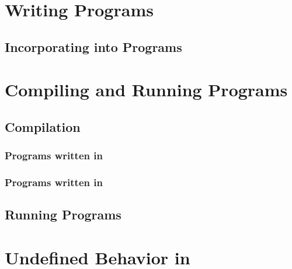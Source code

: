 \clearpage

\appendix

\pagestyle{fancy} \withlinenumbers
\fancyhf{}
\fancyhead[RE, LO]{\leftmark}
\fancyhead[RO, LE]{\thepage}
\fancyfoot[CE,CO]{\thepage}
\renewcommand{\headrulewidth}{0pt}




\chapter{Writing \qcor Programs}
\section*{Incorporating \qcor{} into Programs}\label{sec:writing_programs}



\chapter{Compiling and Running Programs}\label{sec:compiling}

\section{Compilation}
\subsection*{Programs written in \Clang}


\subsection*{Programs written in \Cpp}



\section{Running Programs}





\chapter{Undefined Behavior in \qcor}\label{sec:undefined}





